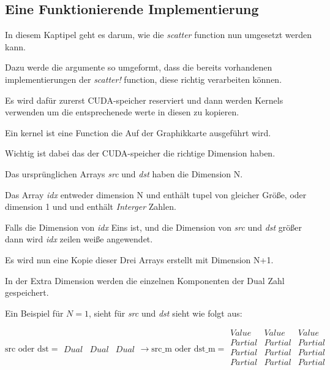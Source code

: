 \subsection{Eine Funktionierende Implementierung}

In diesem Kaptipel geht es darum, wie die \textit{scatter} function nun umgesetzt werden kann.

Dazu werde die argumente so umgeformt, 
dass die bereits vorhandenen implementierungen der \textit{scatter!} function, diese richtig verarbeiten können.

Es wird dafür zurerst CUDA-speicher reserviert und dann werden Kernels verwenden um 
die entsprechenede werte in diesen zu kopieren.

Ein kernel ist eine Function die Auf der Graphikkarte ausgeführt wird.

Wichtig ist dabei das der CUDA-speicher die richtige Dimension haben. 

Das ursprünglichen Arrays \textit{src} und \textit{dst} haben die Dimension N.

Das Array \textit{idx} entweder dimension N und enthält tupel von gleicher Größe,
oder dimension 1 und und enthält \textit{Interger} Zahlen.

Falls die Dimension von \textit{idx} Eins ist, und die Dimension von \textit{src}
und \textit{dst} größer dann wird \textit{idx} zeilen weiße angewendet.

Es wird nun eine Kopie dieser Drei Arrays erstellt mit Dimension N+1.

In der Extra Dimension werden die einzelnen Komponenten der Dual Zahl gespeichert.

Ein Beispiel für $N = 1$, sieht für \textit{src} und \textit{dst} sieht wie folgt aus:

$$

\text{src oder dst} = 

\begin{matrix}
Dual & Dual & Dual
\end{matrix}

\rightarrow

\text{src_m oder dst_m} = 

\begin{matrix}
Value   & Value   & Value   \\
Partial & Partial & Partial \\
Partial & Partial & Partial \\
Partial & Partial & Partial \\
\end{matrix}
$$

